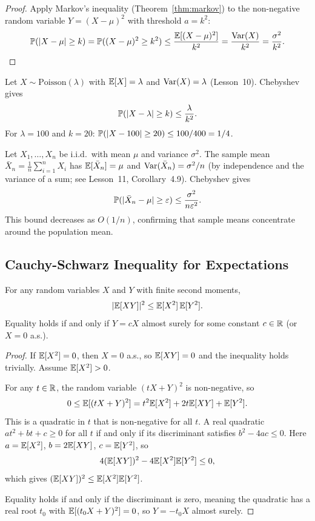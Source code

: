 \documentclass[11pt,a4paper]{article}
\begin{document}
\begin{proof}
Apply Markov's inequality (Theorem~\ref{thm:markov}) to the
non-negative random variable $Y = (X - \mu)^2$ with threshold
$a = k^2$:
\[
    \mathbb{P}(|X - \mu| \geq k)
    = \mathbb{P}((X - \mu)^2 \geq k^2)
    \leq \frac{\mathbb{E}[(X - \mu)^2]}{k^2}
    = \frac{\operatorname{Var}(X)}{k^2}
    = \frac{\sigma^2}{k^2}. \qedhere
\]
\end{proof}

\begin{example}
\label{ex:chebyshev_poisson}
Let $X \sim \mathrm{Poisson}(\lambda)$ with $\mathbb{E}[X] = \lambda$ and
$\operatorname{Var}(X) = \lambda$ (Lesson~10). Chebyshev gives
\[
    \mathbb{P}(|X - \lambda| \geq k) \leq \frac{\lambda}{k^2}.
\]
For $\lambda = 100$ and $k = 20$:
$\mathbb{P}(|X - 100| \geq 20) \leq 100/400 = 1/4$.
\end{example}

\begin{example}
\label{ex:chebyshev_mean}
Let $X_1, \ldots, X_n$ be i.i.d.\ with mean $\mu$ and variance
$\sigma^2$. The sample mean $\bar{X}_n = \frac{1}{n}\sum_{i=1}^n X_i$
has $\mathbb{E}[\bar{X}_n] = \mu$ and
$\operatorname{Var}(\bar{X}_n) = \sigma^2/n$ (by independence and the variance
of a sum; see Lesson~11, Corollary~4.9).
Chebyshev gives
\[
    \mathbb{P}(|\bar{X}_n - \mu| \geq \varepsilon)
    \leq \frac{\sigma^2}{n \varepsilon^2}.
\]
This bound decreases as $O(1/n)$, confirming that sample means
concentrate around the population mean.
\end{example}

\subsection{Cauchy-Schwarz Inequality for Expectations}

\begin{theorem}
\label{thm:cauchy_schwarz}
For any random variables $X$ and $Y$ with finite second moments,
\[
    |\mathbb{E}[XY]|^2 \leq \mathbb{E}[X^2] \, \mathbb{E}[Y^2].
\]
Equality holds if and only if $Y = cX$ almost surely for some
constant $c \in \mathbb{R}$ (or $X = 0$ a.s.).
\end{theorem}

\begin{proof}
If $\mathbb{E}[X^2] = 0$, then $X = 0$ a.s., so $\mathbb{E}[XY] = 0$ and the
inequality holds trivially. Assume $\mathbb{E}[X^2] > 0$.

For any $t \in \mathbb{R}$, the random variable $(tX + Y)^2$ is non-negative,
so
\[
    0 \leq \mathbb{E}[(tX + Y)^2] = t^2 \mathbb{E}[X^2] + 2t \mathbb{E}[XY] + \mathbb{E}[Y^2].
\]
This is a quadratic in $t$ that is non-negative for all $t$. A
real quadratic $at^2 + bt + c \geq 0$ for all $t$ if and only if
its discriminant satisfies $b^2 - 4ac \leq 0$. Here
$a = \mathbb{E}[X^2]$, $b = 2\mathbb{E}[XY]$, $c = \mathbb{E}[Y^2]$, so
\[
    4(\mathbb{E}[XY])^2 - 4\mathbb{E}[X^2]\mathbb{E}[Y^2] \leq 0,
\]
which gives $(\mathbb{E}[XY])^2 \leq \mathbb{E}[X^2]\mathbb{E}[Y^2]$.

Equality holds if and only if the discriminant is zero, meaning
the quadratic has a real root $t_0$ with $\mathbb{E}[(t_0 X + Y)^2] = 0$,
so $Y = -t_0 X$ almost surely.
\end{proof}
\end{document}

